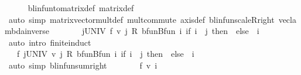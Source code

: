 \begin{isabellebody}
\ \ \ \ \isamarkupfalse%
\ blinfun{\isacharunderscore}{\kern0pt}to{\isacharunderscore}{\kern0pt}matrix{\isacharunderscore}{\kern0pt}def\ matrix{\isacharunderscore}{\kern0pt}def\isanewline
\ \ \ \ \isamarkupfalse%
\ {\isacharparenleft}{\kern0pt}auto\ simp{\isacharcolon}{\kern0pt}\ matrix{\isacharunderscore}{\kern0pt}vector{\isacharunderscore}{\kern0pt}mult{\isacharunderscore}{\kern0pt}def\ mult{\isachardot}{\kern0pt}commute\ axis{\isacharunderscore}{\kern0pt}def\ blinfun{\isachardot}{\kern0pt}scaleR{\isacharunderscore}{\kern0pt}right\ vec{\isacharunderscore}{\kern0pt}lambda{\isacharunderscore}{\kern0pt}inverse{\isacharparenright}{\kern0pt}\isanewline
\ \ \isamarkupfalse%
\ \isamarkupfalse%
\ {\isachardoublequoteopen}{\isasymdots}\ {\isacharequal}{\kern0pt}\ {\isacharparenleft}{\kern0pt}{\isasymSum}j{\isasymin}UNIV{\isachardot}{\kern0pt}\ {\isacharparenleft}{\kern0pt}f\ {\isacharparenleft}{\kern0pt}{\isacharparenleft}{\kern0pt}v\ j\ {\isacharasterisk}{\kern0pt}\isactrlsub R\ bfun{\isachardot}{\kern0pt}Bfun\ {\isacharparenleft}{\kern0pt}{\isasymlambda}i{\isachardot}{\kern0pt}\ if\ i\ {\isacharequal}{\kern0pt}\ j\ then\ {}\ else\ {}{\isacharparenright}{\kern0pt}{\isacharparenright}{\kern0pt}{\isacharparenright}{\kern0pt}{\isacharparenright}{\kern0pt}{\isacharparenright}{\kern0pt}\ i{\isachardoublequoteclose}\isanewline
\ \ \ \ \isamarkupfalse%
\ {\isacharparenleft}{\kern0pt}auto\ intro{\isacharcolon}{\kern0pt}\ finite{\isacharunderscore}{\kern0pt}induct{\isacharparenright}{\kern0pt}\isanewline
\ \ \isamarkupfalse%
\ \isamarkupfalse%
\ {\isachardoublequoteopen}{\isasymdots}\ {\isacharequal}{\kern0pt}\ f\ {\isacharparenleft}{\kern0pt}{\isasymSum}j{\isasymin}UNIV{\isachardot}{\kern0pt}\ {\isacharparenleft}{\kern0pt}v\ j\ {\isacharasterisk}{\kern0pt}\isactrlsub R\ bfun{\isachardot}{\kern0pt}Bfun\ {\isacharparenleft}{\kern0pt}{\isasymlambda}i{\isachardot}{\kern0pt}\ if\ i\ {\isacharequal}{\kern0pt}\ j\ then\ {}\ else\ {}{\isacharparenright}{\kern0pt}{\isacharparenright}{\kern0pt}{\isacharparenright}{\kern0pt}\ i{\isachardoublequoteclose}\isanewline
\ \ \ \ \isamarkupfalse%
\ {\isacharparenleft}{\kern0pt}auto\ simp{\isacharcolon}{\kern0pt}\ blinfun{\isachardot}{\kern0pt}sum{\isacharunderscore}{\kern0pt}right{\isacharparenright}{\kern0pt}\isanewline
\ \ \isamarkupfalse%
\ \isamarkupfalse%
\ {\isachardoublequoteopen}{\isasymdots}\ {\isacharequal}{\kern0pt}\ f\ v\ i{\isachardoublequoteclose}\isanewline

\end{isabellebody}
